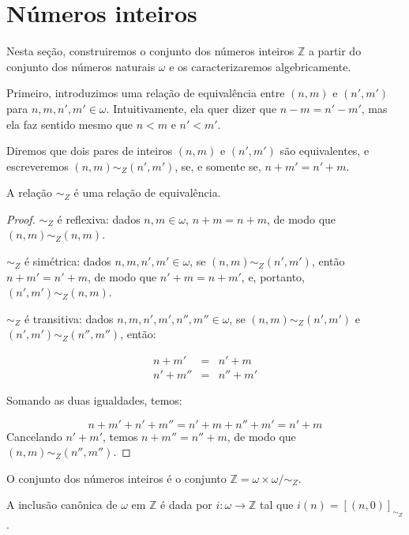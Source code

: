 \section{Números inteiros}\label{sec:numerosInteiros}
Nesta seção, construiremos o conjunto dos números inteiros $\mathbb Z$ a partir do conjunto dos números naturais $\omega$ e os caracterizaremos algebricamente.

Primeiro, introduzimos uma relação de equivalência entre $(n, m)$ e $(n', m')$ para $n, m, n', m' \in \omega$.
Intuitivamente, ela quer dizer que $n-m=n'-m'$, mas ela faz sentido mesmo que $n<m$ e $n'<m'$.

\begin{definition}[$Z^-$]\label{def:inteiros}
    Diremos que dois pares de inteiros $(n, m)$ e $(n', m')$ são equivalentes, e escreveremos $(n, m)\sim_Z (n', m')$, se, e somente se, $n+m'=n'+m$.
\end{definition}

\begin{proposition}[$Z^-$]\label{prop:relacaoDeEquivalenciaDosInteiros}
    A relação $\sim_Z$ é uma relação de equivalência.
\end{proposition}
\begin{proof}
    $\sim_Z$ é reflexiva: dados $n, m \in \omega$, $n+m=n+m$, de modo que $(n, m)\sim_Z (n, m)$.

    $\sim_Z$ é simétrica: dados $n, m, n', m' \in \omega$, se $(n, m)\sim_Z (n', m')$, então $n+m'=n'+m$, de modo que $n'+m=n+m'$, e, portanto, $(n', m')\sim_Z (n, m)$.

    $\sim_Z$ é transitiva: dados $n, m, n', m', n'', m'' \in \omega$, se $(n, m)\sim_Z (n', m')$ e $(n', m')\sim_Z (n'', m'')$, então:

    \[
    \begin{array}{rcl}
        n+m' & = & n'+m \\
        n'+m'' & = & n''+m'
    \end{array}
    \]

    Somando as duas igualdades, temos:

    \[
        n+m'+n'+m'' =  n'+m+n''+m' = n'+m
    \]
    Cancelando $n'+m'$, temos $n+m''=n''+m$, de modo que $(n, m)\sim_Z (n'', m'')$.
\end{proof}

\begin{definition}[$Z^-$]\label{def:conjuntoDosInteiros}
    O conjunto dos números inteiros é o conjunto $\mathbb Z = \omega\times \omega/\sim_Z$.

    A inclusão canônica de $\omega$ em $\mathbb Z$ é dada por $i:\omega\to \mathbb Z$ tal que $i(n)=[(n, 0)]_{\sim_Z}$.
\end{definition}

